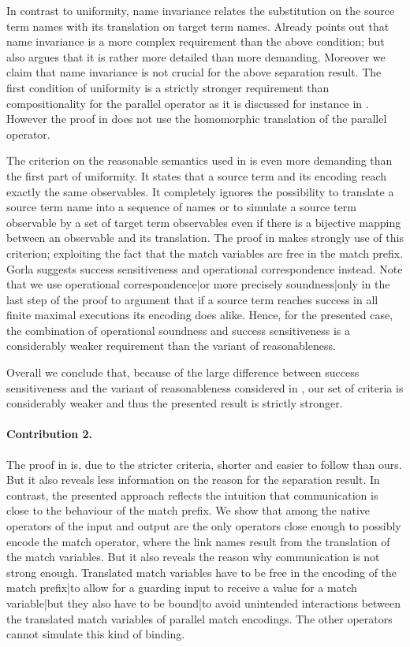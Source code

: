 \documentclass[final,copyright,creativecommons]{eptcs}
\begin{document}
In contrast to uniformity, name invariance relates the substitution on the source term names with its translation on target term names. Already \cite{gorla} points out that name invariance is a more complex requirement than the above condition; but \cite{gorla} also argues that it is rather more detailed than more demanding. Moreover we claim that name invariance is not crucial for the above separation result.
The first condition of uniformity is a strictly stronger requirement than compositionality for the parallel operator as it is discussed for instance in \cite{petphd}. However the proof in \cite{carbone} does not use the homomorphic translation of the parallel operator.

The criterion on the reasonable semantics used in \cite{carbone} is even more demanding than the first part of uniformity. It states that a source term and its encoding reach exactly the same observables.
It completely ignores the possibility to translate a source term name into a sequence of names or to simulate a source term observable by a set of target term observables even if there is a bijective mapping between an observable and its translation. The proof in \cite{carbone} makes strongly use of this criterion; exploiting the fact that the match variables are free in the match prefix.
Gorla suggests success sensitiveness and operational correspondence instead. Note that we use operational correspondence|or more precisely soundness|only in the last step of the proof to argument that if a source term reaches success in all finite maximal executions its encoding does alike. Hence, for the presented case, the combination of operational soundness and success sensitiveness is a considerably weaker requirement than the variant of reasonableness.

Overall we conclude that, because of the large difference between success sensitiveness and the variant of reasonableness considered in \cite{carbone}, our set of criteria is considerably weaker and thus the presented result is strictly stronger.

\paragraph{Contribution 2.}
The proof in \cite{carbone} is, due to the stricter criteria, shorter and easier to follow than ours. But it also reveals less information on the reason for the separation result. In contrast, the presented approach reflects the intuition that communication is close to the behaviour of the match prefix. We show that among the native operators of the \piCal input and output are the only operators close enough to possibly encode the match operator, where the link names result from the translation of the match variables. But it also reveals the reason why communication is not strong enough.
Translated match variables have to be free in the encoding of the match {prefix}|{to} allow for a guarding input to receive a value for a match {variable}|{but} they also have to be {bound}|{to} avoid unintended interactions between the translated match variables of parallel match encodings.
The other \piCal operators cannot simulate this kind of binding.
\end{document}
